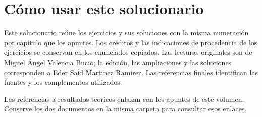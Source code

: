 
\renewcommand{\bibname}{Referencias}
\frontmatter
\hypersetup{pageanchor=false}

\hypersetup{pageanchor=true}
\chapter*{Cómo usar este solucionario}
Este solucionario reúne los ejercicios y sus soluciones con la misma numeración
por capítulo que los apuntes. Los créditos y las indicaciones de procedencia de
los ejercicios se conservan en los enunciados copiados. Las lecturas originales
son de Miguel Ángel Valencia Bucio; la edición, las ampliaciones y las soluciones
corresponden a Eder Said Martinez Ramirez. Las referencias finales identifican
las fuentes y los complementos utilizados.

Las referencias a resultados teóricos enlazan con los apuntes de este volumen.
Conserve los dos documentos en la misma carpeta para consultar esos enlaces.
\hypertarget{indice-general}{}
\tableofcontents
\mainmatter

\backmatter
\renewcommand{\chaptermark}[1]{\markboth{#1}{}}


